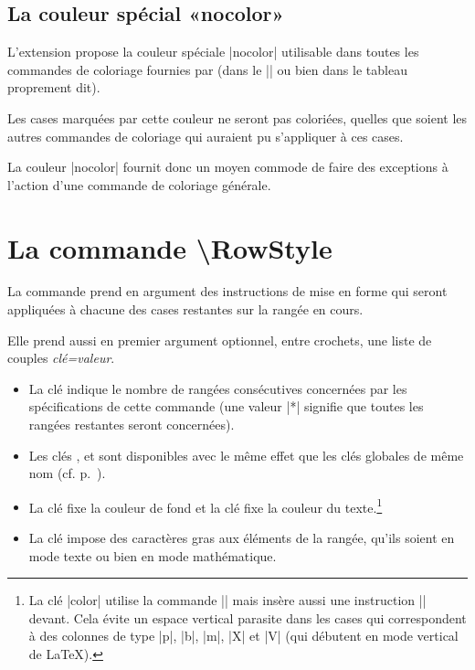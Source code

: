 \documentclass[dvipsnames]{article}%
\begin{document}
\subsection{La couleur spécial «nocolor»}


L'extension  propose la couleur spéciale |nocolor| utilisable
dans toutes les commandes de coloriage fournies par  (dans le
|\CodeBefore| ou bien dans le tableau proprement dit).

Les cases marquées par cette couleur ne seront pas coloriées, quelles que soient
les autres commandes de coloriage qui auraient pu s'appliquer à ces cases. 

La couleur |nocolor| fournit donc un moyen commode de faire des exceptions à
l'action d'une commande de coloriage générale.


\section{La commande \textbackslash RowStyle}

\label{RowStyle}


La commande  prend en argument des instructions de
mise en forme qui seront appliquées à chacune des cases restantes sur la rangée
en cours.

\medskip
Elle prend aussi en premier argument optionnel, entre crochets, une liste de
couples \textsl{clé=valeur}.
\begin{itemize}
\item {}
La clé  indique le nombre de rangées consécutives concernées par
les spécifications de cette commande (une valeur |*| signifie que toutes les
rangées restantes seront concernées).
\item Les clés , 
et  sont disponibles avec le même effet que les
clés globales de même nom (cf. p.~\pageref{cell-space}).

\item 
{}
La clé  fixe la couleur de fond et la clé 
fixe la couleur du texte.\footnote{La clé |color| utilise la commande |\color| mais
  insère aussi une instruction |\leavevmode| devant. Cela évite un espace
  vertical parasite dans les cases qui correspondent à des colonnes de type
  |p|, |b|, |m|, |X| et |V| (qui débutent en mode vertical de LaTeX).}

\item {}
La clé  impose des caractères gras aux éléments de la rangée, qu'ils
soient en mode texte ou bien en mode mathématique.
\end{itemize}
\end{document}
